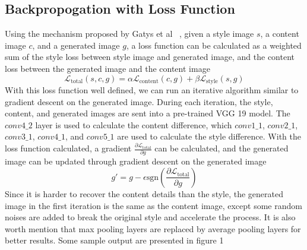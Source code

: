 \documentclass[10pt,twocolumn,letterpaper]{article}
\begin{document}
\subsection{Backpropogation with Loss Function}
Using the mechanism proposed by Gatys et al ~\cite{Gatys}, given a style image $s$, a content image $c$, and a generated image $g$, a loss function can be calculated as a weighted sum of the style loss between style image and generated image, and the content loss between the generated image and the content image
$$\mathcal{L}_{\text{total}}(s, c, g) = \alpha\mathcal{L}_{\text{content}}(c, g) + \beta\mathcal{L}_{\text{style}}(s, g)$$
With this loss function well defined, we can run an iterative algorithm similar to gradient descent on the generated image. During each iteration, the style, content, and generated images are sent into a pre-trained VGG 19 model. The $conv4\_2$ layer is used to calculate the content difference, which $conv1\_1$, $conv2\_1$, $conv3\_1$, $conv4\_1$, and $conv5\_1$ are used to calculate the style difference. With the loss function calculated, a gradient $\frac{\partial\mathcal{L}_{\text{total}}}{\partial g}$ can be calculated, and the generated image can be updated through gradient descent on the generated image
$$g'=g-\epsilon\text{sgn}(\frac{\partial\mathcal{L}_{\text{total}}}{\partial g})$$
Since it is harder to recover the content details than the style, the generated image in the first iteration is the same as the content image, except some random noises are added to break the original style and accelerate the process. It is also worth mention that max pooling layers are replaced by average pooling layers for better results. Some sample output are presented in figure 1
\end{document}
